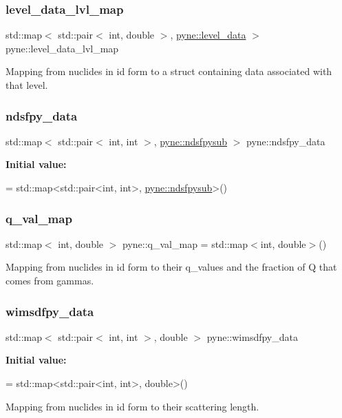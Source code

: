 \subsubsection{\texorpdfstring{level\+\_\+data\+\_\+lvl\+\_\+map}{level\_data\_lvl\_map}}
{\footnotesize\ttfamily std\+::map$<$ std\+::pair$<$ int, double $>$, \hyperlink{structpyne_1_1level__data}{pyne\+::level\+\_\+data} $>$ pyne\+::level\+\_\+data\+\_\+lvl\+\_\+map}

Mapping from nuclides in id form to a struct containing data associated with that level. \mbox{\label{namespacepyne_a0526a4bf1637612d760c106836475c6d}} 
\subsubsection{\texorpdfstring{ndsfpy\+\_\+data}{ndsfpy\_data}}
{\footnotesize\ttfamily std\+::map$<$ std\+::pair$<$ int, int $>$, \hyperlink{structpyne_1_1ndsfpysub}{pyne\+::ndsfpysub} $>$ pyne\+::ndsfpy\+\_\+data}

{\bfseries Initial value\+:}
\begin{DoxyCode}
= 
  std::map<std::pair<int, int>, \hyperlink{structpyne_1_1ndsfpysub}{pyne::ndsfpysub}>()
\end{DoxyCode}
\mbox{\label{namespacepyne_af7b850fa105454bc35f4167d41071239}} 
\subsubsection{\texorpdfstring{q\+\_\+val\+\_\+map}{q\_val\_map}}
{\footnotesize\ttfamily std\+::map$<$ int, double $>$ pyne\+::q\+\_\+val\+\_\+map = std\+::map$<$int, double$>$()}

Mapping from nuclides in id form to their q\+\_\+values and the fraction of Q that comes from gammas. \mbox{\label{namespacepyne_a2512ebcde5e39e49cd6ed25bb09ff374}} 
\subsubsection{\texorpdfstring{wimsdfpy\+\_\+data}{wimsdfpy\_data}}
{\footnotesize\ttfamily std\+::map$<$ std\+::pair$<$ int, int $>$, double $>$ pyne\+::wimsdfpy\+\_\+data}

{\bfseries Initial value\+:}
\begin{DoxyCode}
= 
  std::map<std::pair<int, int>, \textcolor{keywordtype}{double}>()
\end{DoxyCode}


Mapping from nuclides in id form to their scattering length. 

